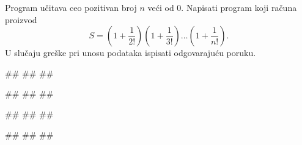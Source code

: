 \begin{Exercise}[difficulty=1, label=p1.7_razno7] 
Program učitava ceo pozitivan broj $n$ veći od $0$.  Napisati program
koji računa proizvod
$$S = (1 + \frac{1}{2!})(1 + \frac{1}{3!})\ldots(1 +
\frac{1}{n!}).$$ U slučaju greške pri unosu podataka ispisati 
odgovarajuću  poruku.  
  
\begin{miditest}
\begin{upotreba}{1}
#\naslovInt#
##
##
\end{upotreba}
\end{miditest}
\begin{miditest}
\begin{upotreba}{2}
#\naslovInt#
##
##
\end{upotreba}
\end{miditest}

\begin{miditest}
\begin{upotreba}{3}
#\naslovInt#
##
##
\end{upotreba}
\end{miditest}
\begin{miditest}
\begin{upotreba}{4}
#\naslovInt#
##
##
\end{upotreba}
\end{miditest}
\end{Exercise}
\begin{Answer}[ref=p1.7_razno7]
\end{Answer}

